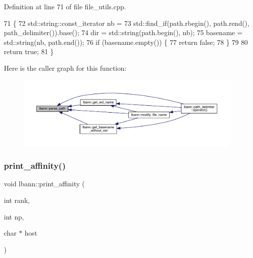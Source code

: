 Definition at line 71 of file file\+\_\+utils.\+cpp.


\begin{DoxyCode}
71                                                                             \{
72   std::string::const\_iterator nb =
73     std::find\_if(path.rbegin(), path.rend(), path\_delimiter()).base();
74   dir =  std::string(path.begin(), nb);
75   basename = std::string(nb, path.end());
76   \textcolor{keywordflow}{if} (basename.empty()) \{
77     \textcolor{keywordflow}{return} \textcolor{keyword}{false};
78   \}
79 
80   \textcolor{keywordflow}{return} \textcolor{keyword}{true};
81 \}
\end{DoxyCode}
Here is the caller graph for this function\+:\nopagebreak
\begin{figure}[H]
\begin{center}
\leavevmode
\includegraphics[width=350pt]{namespacelbann_a1ce6832a54235a5fb333f50fffbe1b63_icgraph}
\end{center}
\end{figure}
\mbox{\label{namespacelbann_a4fd83a86cf27ca7bc1e01576a5ee36e0}} 
\subsubsection{\texorpdfstring{print\+\_\+affinity()}{print\_affinity()}}
{\footnotesize\ttfamily void lbann\+::print\+\_\+affinity (\begin{DoxyParamCaption}\item[{int}]{rank,  }\item[{int}]{np,  }\item[{char $\ast$}]{host }\end{DoxyParamCaption})}

